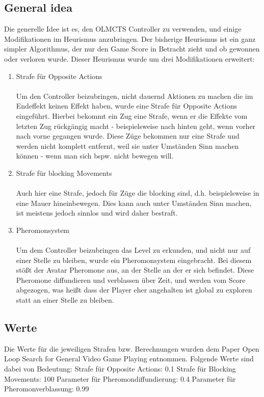 \documentclass[a4paper]{article}
\begin{document}
\subsection{General idea}
Die generelle Idee ist es, den OLMCTS Controller zu verwenden, und einige Modifikationen im Heurismus anzubringen. Der bisherige Heurismus ist ein ganz simpler Algorithmus, der nur den Game Score in Betracht zieht und ob gewonnen oder verloren wurde. Dieser Heurismus wurde um drei Modifikationen erweitert:
\begin{enumerate}
	\item Strafe für Opposite Actions
	\paragraph{}
	Um den Controller beizubringen, nicht dauernd Aktionen zu machen die im Endeffekt keinen Effekt haben, wurde eine Strafe für Opposite Actions eingeführt. Hierbei bekommt ein Zug eine Strafe, wenn er die Effekte vom letzten Zug rückgängig macht - beispielsweise nach hinten geht, wenn vorher nach vorne gegangen wurde. Diese Züge bekommen nur eine Strafe und werden nicht komplett entfernt, weil sie unter Umständen Sinn machen können - wenn man sich bspw. nicht bewegen will.
	\item Strafe für blocking Movements
	\paragraph{}
	Auch hier eine Strafe, jedoch für Züge die blocking sind, d.h. beispielsweise in eine Mauer hineinbewegen. Dies kann auch unter Umständen Sinn machen, ist meistens jedoch sinnlos und wird daher bestraft.
	\item Pheromonsystem
	\paragraph{}
	Um dem Controller beizubringen das Level zu erkunden, und nicht nur auf einer Stelle zu bleiben, wurde ein Pheromonsystem eingebracht. Bei diesem stößt der Avatar Pheromone aus, an der Stelle an der er sich befindet. Diese Pheromone diffundieren und verblassen über Zeit, und werden vom Score abgezogen, was heißt dass der Player eher angehalten ist global zu exploren statt an einer Stelle zu bleiben. 
\end{enumerate}

\subsection{Werte}
Die Werte für die jeweiligen Strafen bzw. Berechnungen wurden dem Paper Open Loop Search for General Video Game Playing entnommen. Folgende Werte sind dabei von Bedeutung:
Strafe für Opposite Actions: 0.1
Strafe für Blocking Movements: 100
Parameter für Pheromondiffundierung: 0.4
Parameter für Pheromonverblassung: 0.99
\end{document}
